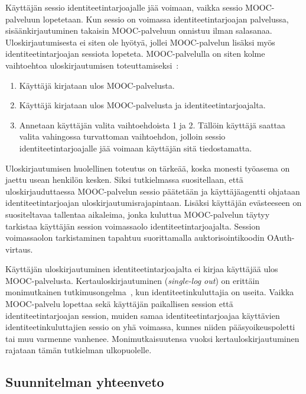 \documentclass[finnish,gradu]{tktltiki}
\begin{document}
  Käyttäjän sessio identiteetintarjoajalle jää voimaan, vaikka sessio MOOC-palveluun lopetetaan. Kun sessio on voimassa identiteetintarjoajan palvelussa, sisäänkirjautuminen takaisin MOOC-palveluun onnistuu ilman salasanaa. Uloskirjautumisesta ei siten ole hyötyä, jollei MOOC-palvelun lisäksi myös identiteetintarjoajan sessiota lopeteta. MOOC-palvelulla on siten kolme vaihtoehtoa uloskirjautumisen toteuttamiseksi~\cite{shepard_logout_2009}:

  \begin{enumerate}
    \item Käyttäjä kirjataan ulos MOOC-palvelusta.
    \item Käyttäjä kirjataan ulos MOOC-palvelusta ja identiteetintarjoajalta.
    \item Annetaan käyttäjän valita vaihtoehdoista 1 ja 2. Tällöin käyttäjä saattaa valita vahingossa turvattoman vaihtoehdon, jolloin sessio identiteetintarjoajalle jää voimaan käyttäjän sitä tiedostamatta.
  \end{enumerate}

  Uloskirjautumisen huolellinen toteutus on tärkeää, koska monesti työasema on jaettu usean henkilön kesken. Siksi tutkielmassa suositellaan, että uloskirjauduttaessa MOOC-palvelun sessio päätetään ja käyttäjäagentti ohjataan identiteetintarjoajan uloskirjautumisrajapintaan. Lisäksi käyttäjän evästeeseen on suositeltavaa tallentaa aikaleima, jonka kuluttua MOOC-palvelun täytyy tarkistaa käyttäjän session voimassaolo identiteetintarjoajalta. Session voimassaolon tarkistaminen tapahtuu suorittamalla auktorisointikoodin OAuth-virtaus.

  Käyttäjän uloskirjautuminen identiteetintarjoajalta ei kirjaa käyttäjää ulos MOOC-palvelusta. Kertauloskirjautuminen (\emph{single-log out}) on erittäin monimutkainen tutkimusongelma~\cite{shibboleth_wiki_slo}, kun identiteetinkuluttajia on useita. Vaikka MOOC-palvelu lopettaa sekä käyttäjän paikallisen session että identiteetintarjoajan session, muiden samaa identiteetintarjoajaa käyttävien identiteetinkuluttajien sessio on yhä voimassa, kunnes niiden pääsyoikeuspoletti tai muu varmenne vanhenee. Monimutkaisuutensa vuoksi kertauloskirjautuminen rajataan tämän tutkielman ulkopuolelle.



  \subsection{Suunnitelman yhteenveto} %
  \label{sub:suunnitelman_arviointi}
\end{document}
